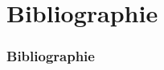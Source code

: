 \section{Bibliographie}

\begin{frame}[containsverbatim]
    \frametitle{Bibliographie}
    \encours
\end{frame}